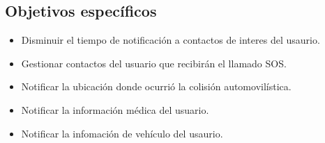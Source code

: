 \subsection{Objetivos específicos}
\begin{itemize}
	\item Disminuir el tiempo de notificación a contactos de interes del usaurio.
	\item Gestionar contactos del usuario que recibirán el llamado SOS.
	\item Notificar la ubicación donde ocurrió la colisión automovilística.
	\item Notificar la información médica del usuario.
	\item Notificar la infomación de vehículo del usaurio.
	
\end{itemize}

